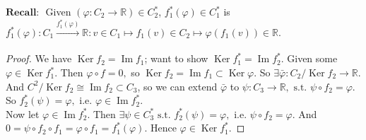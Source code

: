 \documentclass[10pt]{article}
\theoremstyle{plain}
\theoremstyle{definition}
\newcommand{\st}{\text{ s.t. }}
\newcommand{\ie}{\text{ i.e. }}
\newcommand{\Recall}{\textbf{Recall: }}
\newcommand{\Real}{\mathbb{R}}
\DeclareMathOperator{\Ker}{Ker}
\DeclareMathOperator{\Ima}{Im}
\begin{document}
\noindent
$\Recall$ Given $(\varphi : C_2 \to \Real ) \in C_2^*$, $f_1^*( \varphi)\in C_1^*$ is $f_1^*(\varphi) : C_1 \xrightarrow[]{f_1^*(\varphi)} \Real: v\in C_1 \mapsto f_1(v) \in C_2 \mapsto \varphi(f_1(v))\in \Real$.

\begin{proof}
We have $\Ker f_2 = \Ima f_1$; want to show $\Ker f_1^* = \Ima f_2^*$. Given some $\varphi \in \Ker f_1^*$. Then $\varphi \circ f = 0,$ so $\Ker f_2 = \Ima f_1 \subset \Ker \varphi$. So $\exists \bar{\varphi} : C_2 / \Ker f_2 \to \Real$. And $C^2 /\Ker f_2 \cong \Ima f_2 \subset C_3$, so we can extend $\bar{\varphi} $ to $\psi : C_3 \to \Real, \st \psi \circ f_2 = \varphi$. So $f_2^*(\psi) = \varphi, \ie \varphi \in \Ima f_2^*.$\\
Now let $\varphi \in \Ima f_2^*.$ Then $\exists \psi \in C_3^* \st f_2^*(\psi) = \varphi, \ie \psi \circ f_2 = \varphi.$ And $0 = \psi \circ f_2 \circ f_1 = \varphi \circ f_1 = f_1^*(\varphi).$ Hence $\varphi \in \Ker f_1^*$.
\end{proof}
\end{document}
